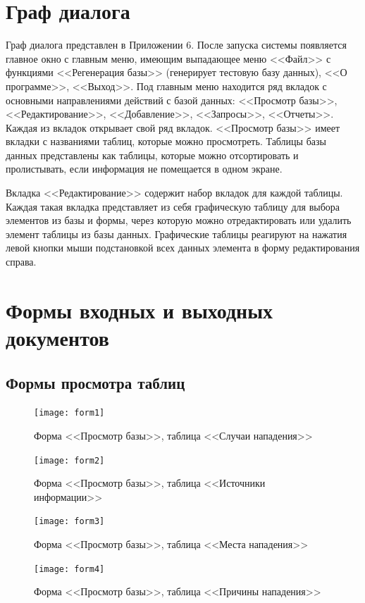 \documentclass[russian,utf8,simple,emptystyle]{eskdtext}
\begin{document}
\section{Граф диалога}
Граф диалога представлен в Приложении 6. После запуска системы появляется главное окно с главным меню, имеющим выпадающее меню <<Файл>> с функциями <<Регенерация базы>> (генерирует тестовую базу данных), <<О программе>>, <<Выход>>. Под главным меню находится ряд вкладок с основными направлениями действий с базой данных: <<Просмотр базы>>, <<Редактирование>>, <<Добавление>>, <<Запросы>>, <<Отчеты>>. Каждая из вкладок открывает свой ряд
вкладок. <<Просмотр базы>> имеет вкладки с названиями таблиц, которые можно просмотреть. Таблицы базы данных представлены как таблицы, которые можно отсортировать и пролистывать, если информация не помещается в одном экране.

Вкладка <<Редактирование>> содержит набор вкладок для каждой таблицы. Каждая такая вкладка представляет из себя графическую таблицу для выбора элементов из базы и формы, через которую можно отредактировать или удалить элемент таблицы из базы данных. Графические таблицы реагируют на нажатия левой кнопки мыши подстановкой всех данных элемента в форму редактирования справа.

\clearpage
\section{Формы входных и выходных документов}
\subsection{Формы просмотра таблиц}
\begin{figure}[ht]
\centering
\texttt{[image: form1]}
\caption{Форма <<Просмотр базы>>, таблица <<Случаи нападения>>}
\end{figure}

\begin{figure}[hb]
\centering
\texttt{[image: form2]}
\caption{Форма <<Просмотр базы>>, таблица <<Источники информации>>}
\end{figure}

\begin{figure}[ht]
\centering
\texttt{[image: form3]}
\caption{Форма <<Просмотр базы>>, таблица <<Места нападения>>}
\end{figure}

\begin{figure}[hb]
\centering
\texttt{[image: form4]}
\caption{Форма <<Просмотр базы>>, таблица <<Причины нападения>>}
\end{figure}
\end{document}
